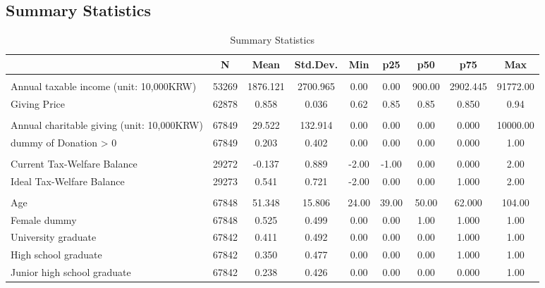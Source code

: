 \documentclass[ review  , 3p ]{elsarticle}
\begin{document}
  \hypertarget{summary-statistics}{%
  \subsection{Summary Statistics}\label{summary-statistics}}
  
  \begin{table}
  
  \caption{\label{tab:kableSummaryCovariate}Summary Statistics}
  \centering
  \fontsize{8}{10}\selectfont
  \begin{tabular}[t]{lcccccccc}
  \toprule
   & N & Mean & Std.Dev. & Min & p25 & p50 & p75 & Max\\
  \midrule
  \addlinespace[0.3em]
  \multicolumn{9}{l}{\textbf{Income and Giving Price}}\\
  \hspace{1em}Annual taxable income (unit: 10,000KRW) & 53269 & 1876.121 & 2700.965 & 0.00 & 0.00 & 900.00 & 2902.445 & 91772.00\\
  \hspace{1em}Giving Price & 62878 & 0.858 & 0.036 & 0.62 & 0.85 & 0.85 & 0.850 & 0.94\\
  \addlinespace[0.3em]
  \multicolumn{9}{l}{\textbf{Charitable Donations}}\\
  \hspace{1em}Annual charitable giving (unit: 10,000KRW) & 67849 & 29.522 & 132.914 & 0.00 & 0.00 & 0.00 & 0.000 & 10000.00\\
  \hspace{1em}dummy of Donation > 0 & 67849 & 0.203 & 0.402 & 0.00 & 0.00 & 0.00 & 0.000 & 1.00\\
  \addlinespace[0.3em]
  \multicolumn{9}{l}{\textbf{Government Efficiency}}\\
  \hspace{1em}Current Tax-Welfare Balance & 29272 & -0.137 & 0.889 & -2.00 & -1.00 & 0.00 & 0.000 & 2.00\\
  \hspace{1em}Ideal Tax-Welfare Balance & 29273 & 0.541 & 0.721 & -2.00 & 0.00 & 0.00 & 1.000 & 2.00\\
  \addlinespace[0.3em]
  \multicolumn{9}{l}{\textbf{Individual Characteristics}}\\
  \hspace{1em}Age & 67848 & 51.348 & 15.806 & 24.00 & 39.00 & 50.00 & 62.000 & 104.00\\
  \hspace{1em}Female dummy & 67848 & 0.525 & 0.499 & 0.00 & 0.00 & 1.00 & 1.000 & 1.00\\
  \hspace{1em}University graduate & 67842 & 0.411 & 0.492 & 0.00 & 0.00 & 0.00 & 1.000 & 1.00\\
  \hspace{1em}High school graduate & 67842 & 0.350 & 0.477 & 0.00 & 0.00 & 0.00 & 1.000 & 1.00\\
  \hspace{1em}Junior high school graduate & 67842 & 0.238 & 0.426 & 0.00 & 0.00 & 0.00 & 0.000 & 1.00\\
  \bottomrule
  \end{tabular}
  \end{table}
  
\end{document}
